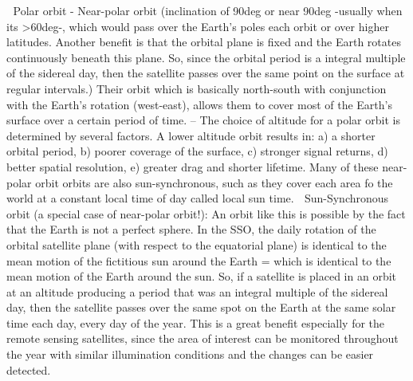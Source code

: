 	Polar orbit - Near-polar orbit (inclination of 90deg or near 90deg -usually when its >60deg-, which would pass over the Earth's poles each orbit or over higher latitudes. Another benefit is that the orbital plane is fixed and the Earth rotates continuously beneath this plane. So, since the orbital period is a integral multiple of the sidereal day, then the satellite passes over the same point on the surface at regular intervals.) Their orbit which is basically north-south with conjunction with the Earth's rotation (west-east), allows them to cover most of the Earth's surface over a certain period of time.
-- The choice of altitude for a polar orbit is determined by several factors. A lower altitude orbit results in: a) a shorter orbital period, b) poorer coverage of the surface, c) stronger signal returns, d) better spatial resolution, e) greater drag and shorter lifetime.
Many of these near-polar orbit orbits are also sun-synchronous, such as they cover each area fo the world at a constant local time of day called local sun time.
	Sun-Synchronous orbit (a special case of near-polar orbit!):
An orbit like this is possible by the fact that the Earth is not a perfect sphere. In the SSO, the daily rotation of the orbital satellite plane (with respect to the equatorial plane) is identical to the mean motion of the fictitious sun around the Earth = which is identical to the mean motion of the Earth around the sun. So, if a satellite is placed in an orbit at an altitude producing a period that was an integral multiple of the sidereal day, then the satellite passes over the same spot on the Earth at the same solar time each day, every day of the year. This is a great benefit especially for the remote sensing satellites, since the area of interest can be monitored throughout the year with similar illumination conditions and the changes can be easier detected.

